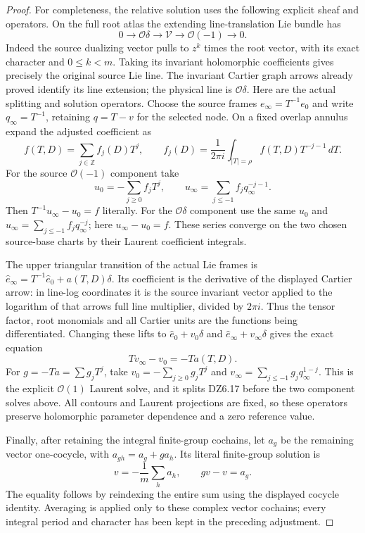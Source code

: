 \begin{proof}
For completeness, the relative solution uses the following
explicit sheaf and operators. On the full root atlas the
extending line-translation Lie bundle has
\[
 0\longrightarrow\mathcal O\delta\longrightarrow\mathcal V
       \longrightarrow\mathcal O(-1)\longrightarrow0.
 \tag{DZ6.17}
\]
Indeed the source dualizing vector pulls to \(z^k\) times the
root vector, with its exact character and \(0\le k<m\).
Taking its invariant holomorphic coefficients gives precisely
the original source Lie line. The invariant Cartier graph
arrows already proved identify its line extension; the physical
line is \(\mathcal O\delta\). Here are the actual splitting
and solution operators. Choose the source frames
\(e_\infty=T^{-1}e_0\) and write \(q_\infty=T^{-1}\),
retaining \(q=T-v\) for the selected node. On a fixed
overlap annulus expand the adjusted coefficient as
\[
 f(T,D)=\sum_{j\in\mathbb Z}f_j(D)T^j,\qquad
 f_j(D)=\frac1{2\pi i}\int_{|T|=\rho}
                     f(T,D)T^{-j-1}\,dT .
 \tag{DZ6.17c}
\]
For the source \(\mathcal O(-1)\) component take
\[
 u_0=-\sum_{j\ge0}f_jT^j,\qquad
 u_\infty=\sum_{j\le-1}f_j q_\infty^{-j-1}.
\]
Then \(T^{-1}u_\infty-u_0=f\) literally. For the
\(\mathcal O\delta\) component use the same \(u_0\) and
\(u_\infty=\sum_{j\le-1}f_jq_\infty^{-j}\); here
\(u_\infty-u_0=f\).
These series converge on the two chosen source-base charts
by their Laurent coefficient integrals.

The upper triangular transition of the actual Lie frames
is \(\widehat e_\infty=T^{-1}\widehat e_0+
a(T,D)\delta\). Its coefficient is the derivative of the
displayed Cartier arrow: in line-log coordinates it is the
source invariant vector applied to the logarithm of that
arrow\textquotesingle s full line multiplier, divided by \(2\pi i\).
Thus the tensor factor, root monomials and all Cartier units
are the functions being differentiated. Changing these
lifts to \(\widehat e_0+v_0\delta\) and
\(\widehat e_\infty+v_\infty\delta\) gives the exact equation
\[
              T v_\infty-v_0=-T a(T,D).
 \tag{DZ6.17d}
\]
For \(g=-Ta=\sum g_jT^j\), take
\(v_0=-\sum_{j\ge0}g_jT^j\) and
\(v_\infty=\sum_{j\le-1}g_j q_\infty^{1-j}\).
This is the explicit \(\mathcal O(1)\) Laurent solve, and it
splits DZ6.17 before the two component solves above.
All contours and Laurent projections are fixed, so these
operators preserve holomorphic parameter dependence and
a zero reference value.

Finally, after retaining the integral finite-group cochains,
let \(a_g\) be the remaining vector one-cocycle, with
\(a_{gh}=a_g+g a_h\). Its literal finite-group solution is
\[
                  v=-\frac1m\sum_h a_h,\qquad
                         g v-v=a_g .
 \tag{DZ6.17e}
\]
The equality follows by reindexing the entire sum using the
displayed cocycle identity. Averaging is applied only to these
complex vector cochains; every integral period and character
has been kept in the preceding adjustment.


\end{proof}
